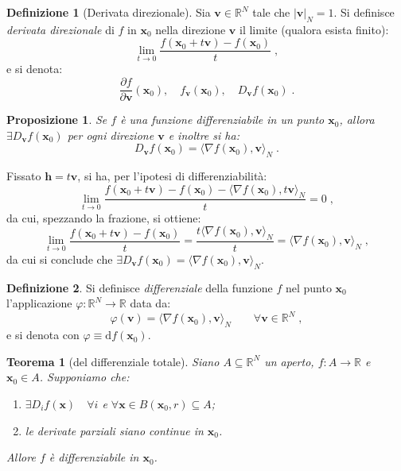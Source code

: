 \documentclass[a4paper,12pt]{report}
\theoremstyle{plain}
\newtheorem{thm}{Teorema}[section]
\newtheorem{prop}{Proposizione}[section]
\theoremstyle{definition}
\newtheorem{defn}{Definizione}[section]
\theoremstyle{remark}
\newcommand{\diff}[1]{\mathrm{d}#1}
\numberwithin{equation}{section}
\begin{document}
\begin{defn}[Derivata direzionale] Sia $\mathbf{v} \in \mathbb{R}^N$ tale che $|\mathbf{v}|_N=1$. Si definisce \textit{derivata direzionale} di $f$ in $\mathbf{x}_0$ nella direzione $\mathbf{v}$ il limite (qualora esista finito):
\begin{equation}
\lim_{t \to 0} \frac{f(\mathbf{x}_0+t\mathbf{v})-f(\mathbf{x}_0)}{t}\;,
\end{equation}
e si denota:
\begin{equation}
\frac{\partial f}{\partial \mathbf{v}}(\mathbf{x}_0),\quad f_{\mathbf{v}}(\mathbf{x}_0),\quad D_{\mathbf{v}} f(\mathbf{x}_0)\;.
\end{equation}
\end{defn}
\begin{prop} Se $f$ è una funzione differenziabile in un punto $\mathbf{x}_0$, allora $\exists D_{\mathbf{v}}f(\mathbf{x}_0)$ per ogni direzione $\mathbf{v}$ e inoltre si ha:
\begin{equation}
D_{\mathbf{v}}f(\mathbf{x}_0)=\langle \nabla f(\mathbf{x}_0),\mathbf{v}\rangle_N\;.
\end{equation}
\end{prop}
\proof Fissato $\mathbf{h}=t\mathbf{v}$, si ha, per l'ipotesi di differenziabilità:
\begin{equation}
\lim_{t \to 0} \frac{f(\mathbf{x}_0+t\mathbf{v})-f(\mathbf{x}_0)-\langle \nabla f(\mathbf{x}_0),t\mathbf{v}\rangle_N}{t}=0\;,
\end{equation}
da cui, spezzando la frazione, si ottiene:
\begin{equation}
\lim_{t \to 0} \frac{f(\mathbf{x}_0+t\mathbf{v})-f(\mathbf{x}_0)}{t}=\frac{t\langle \nabla f(\mathbf{x}_0),\mathbf{v}\rangle_N}{t}=
\langle \nabla f(\mathbf{x}_0),\mathbf{v}\rangle_N\;,
\end{equation}
da cui si conclude che $\exists D_{\mathbf{v}} f(\mathbf{x}_0) = \langle \nabla f(\mathbf{x}_0),\mathbf{v}\rangle_N$.
\endproof
\begin{defn} Si definisce \textit{differenziale} della funzione $f$ nel punto $\mathbf{x}_0$ l'applicazione $\varphi:\mathbb{R}^N \to \mathbb{R}$ data da:
\begin{equation}
\varphi(\mathbf{v})=\langle \nabla f(\mathbf{x}_0),\mathbf{v}\rangle_N \qquad \forall \mathbf{v} \in \mathbb{R}^N\;,
\end{equation}
e si denota con $\varphi \equiv \diff{f}(\mathbf{x}_0)$.
\end{defn}
\begin{thm}[del differenziale totale] Siano $A \subseteq \mathbb{R}^N$ un aperto, $f:A \to \mathbb{R}$ e $\mathbf{x}_0 \in A$. Supponiamo che:
\begin{enumerate}
 \item $\exists D_i f(\mathbf{x}) \quad \forall i$ e $\forall \mathbf{x} \in B(\mathbf{x}_0,r)\subseteq A$;
 \item le derivate parziali siano continue in $\mathbf{x}_0$.
\end{enumerate}
Allore $f$ è differenziabile in $\mathbf{x}_0$.
\end{thm}
\end{document}
